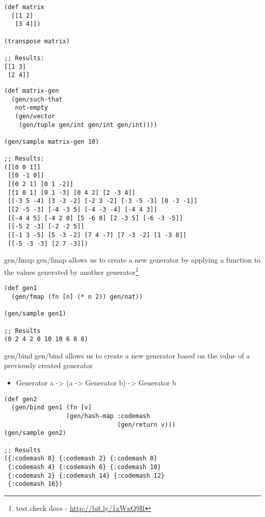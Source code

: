 \documentclass[presentation, bigger]{beamer}
\begin{document}
\begin{frame}[fragile,shrink,label=sec-]{}
 \begin{verbatim}
(def matrix
  [[1 2]
   [3 4]])

(transpose matrix)

;; Results:
[[1 3]
 [2 4]]
\end{verbatim}
\end{frame}
\begin{frame}[fragile,shrink,label=sec-]{}
 \begin{verbatim}
(def matrix-gen
  (gen/such-that
   not-empty
   (gen/vector
    (gen/tuple gen/int gen/int gen/int))))

(gen/sample matrix-gen 10)

;; Results:
([[0 0 1]]
 [[0 -1 0]]
 [[0 2 1] [0 1 -2]]
 [[1 0 1] [0 1 -3] [0 4 2] [2 -3 4]]
 [[-3 5 -4] [3 -3 -2] [-2 3 -2] [-3 -5 -3] [0 -3 -1]]
 [[2 -5 -3] [-4 -3 5] [-4 -3 -4] [-4 4 3]]
 [[-4 4 5] [-4 2 0] [5 -6 0] [2 -3 5] [-6 -3 -5]]
 [[-5 2 -3] [-2 -2 5]]
 [[-1 3 -5] [5 -3 -2] [7 4 -7] [7 -3 -2] [1 -3 8]]
 [[-5 -3 -3] [2 7 -3]])
\end{verbatim}
\end{frame}
\begin{frame}[fragile,label=sec-]{gen/fmap}
 \alert{gen/fmap} allows us to create a new generator by applying a function to the
values generated by another generator\footnote{test.check docs - \url{http://bit.ly/1xWxQ9R}}

\begin{verbatim}
(def gen1
  (gen/fmap (fn [n] (* n 2)) gen/nat))

(gen/sample gen1)

;; Results
(0 2 4 2 0 10 10 6 8 8)
\end{verbatim}
\end{frame}
\begin{frame}[fragile,label=sec-]{gen/bind}
 \alert{gen/bind} allows us to create a new generator based on the value of a
previously created generator\footnotemark[6]{}

\begin{itemize}
\item Generator a -> (a -> Generator b) -> Generator b
\end{itemize}

\begin{verbatim}
(def gen2
  (gen/bind gen1 (fn [v]
                 (gen/hash-map :codemash
                               (gen/return v)))
(gen/sample gen2)

;; Results
({:codemash 0} {:codemash 2} {:codemash 0}
 {:codemash 4} {:codemash 6} {:codemash 10}
 {:codemash 2} {:codemash 14} {:codemash 12}
 {:codemash 16})
\end{verbatim}
\end{frame}
\end{document}
